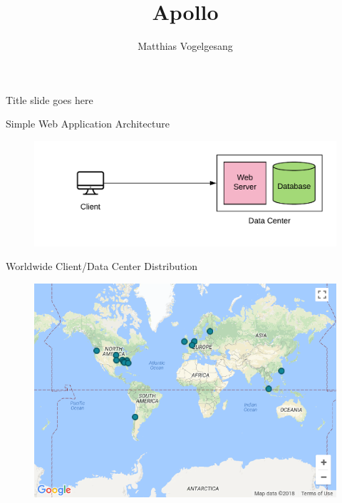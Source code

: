 \documentclass[10pt]{beamer}
\title{Apollo}
\date{}
\author{Matthias Vogelgesang}
\institute{Center for modern beamer themes}
\begin{document}
\begin{frame}{}
    Title slide goes here
\end{frame}

\begin{frame}{Simple Web Application Architecture}
    \begin{figure}
        \center
        \hspace*{-1cm}
        \includegraphics[scale=0.2]{apollo_intro_arch}
    \end{figure}
\end{frame}

\begin{frame}{Worldwide Client/Data Center Distribution}
    \begin{figure}
        \center
        \includegraphics[scale=0.45]{apollo_google_dc}
    \end{figure}
\end{frame}
\end{document}
